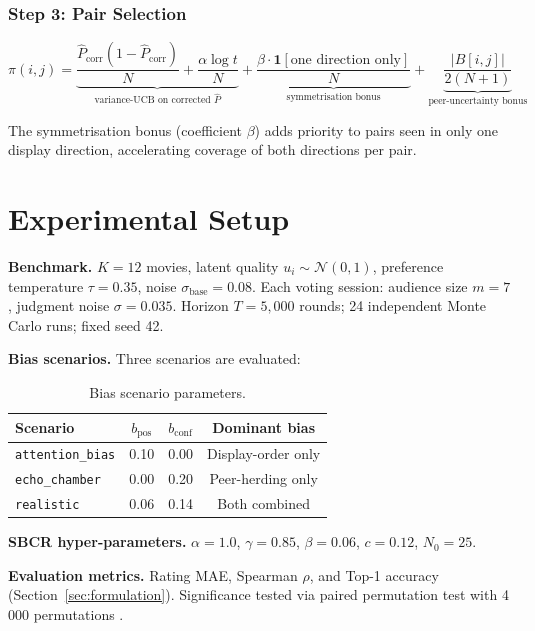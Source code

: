 \documentclass[12pt,a4paper]{article}
\begin{document}
\subsubsection{Step 3: Pair Selection}

\begin{equation}\label{eq:sel}
  \pi(i,j)
  = \underbrace{\frac{\hat{P}_{\text{corr}}(1-\hat{P}_{\text{corr}})}{N}
    + \frac{\alpha\log t}{N}}_{\text{variance-UCB on corrected } \hat{P}}
  + \underbrace{\frac{\beta \cdot \mathbf{1}[\text{one direction only}]}{N}
    }_{\text{symmetrisation bonus}}
  + \underbrace{\frac{|B[i,j]|}{2(N+1)}}_{\text{peer-uncertainty bonus}}
\end{equation}

The symmetrisation bonus (coefficient $\beta$) adds priority to pairs seen in only
one display direction, accelerating coverage of both directions per pair.

\section{Experimental Setup}

\textbf{Benchmark.}  $K = 12$ movies, latent quality $u_i \sim \mathcal{N}(0,1)$,
preference temperature $\tau = 0.35$, noise $\sigma_{\text{base}} = 0.08$.
Each voting session: audience size $m = 7$, judgment noise $\sigma = 0.035$.
Horizon $T = 5{,}000$ rounds; 24 independent Monte Carlo runs; fixed seed 42.

\textbf{Bias scenarios.}  Three scenarios are evaluated:

\begin{table}[h]
\centering
\caption{Bias scenario parameters.}
\label{tab:scenarios}
\begin{tabular}{lccc}
\toprule
Scenario & $b_{\text{pos}}$ & $b_{\text{conf}}$ & Dominant bias \\
\midrule
\texttt{attention\_bias} & 0.10 & 0.00 & Display-order only \\
\texttt{echo\_chamber}   & 0.00 & 0.20 & Peer-herding only  \\
\texttt{realistic}       & 0.06 & 0.14 & Both combined      \\
\bottomrule
\end{tabular}
\end{table}

\textbf{SBCR hyper-parameters.}  $\alpha = 1.0$, $\gamma = 0.85$, $\beta = 0.06$,
$c = 0.12$, $N_0 = 25$.

\textbf{Evaluation metrics.}  Rating MAE, Spearman $\rho$, and Top-1 accuracy
(Section~\ref{sec:formulation}).  Significance tested via paired permutation test
with 4\,000 permutations \cite{good2000permutation}.
\end{document}
